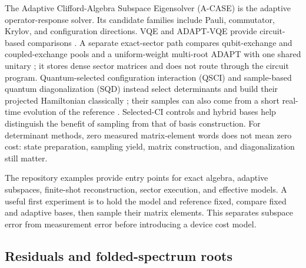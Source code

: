 \documentclass[aps,pra,reprint,superscriptaddress,nofootinbib,floatfix,
  showkeys]{revtex4-2}
\begin{document}
The Adaptive Clifford-Algebra Subspace Eigensolver (A-CASE) is the adaptive
operator-response solver. Its candidate families include
Pauli, commutator, Krylov, and configuration directions. VQE and ADAPT-VQE
provide circuit-based comparisons \cite{peruzzo2014vqe,grimsley2019adapt}.
A separate exact-sector path compares qubit-exchange and coupled-exchange pools
\cite{ramoa2025ceo} and a uniform-weight multi-root ADAPT with one shared
unitary \cite{grimsley2025excited}; it stores dense sector matrices and does not
route through the circuit program.
Quantum-selected configuration interaction (QSCI) and sample-based quantum
diagonalization (SQD) instead select determinants and build their projected
Hamiltonian classically \cite{kanno2026qsci,robledomoreno2025sqd}; their
samples can also come from a short real-time evolution of the reference
\cite{mikkelsen2025teqsci}. Selected-CI
controls \cite{huron1973cipsi} and hybrid bases help distinguish the benefit of
sampling from that of basis construction.
For determinant methods, zero measured matrix-element words does not mean zero
cost: state preparation, sampling yield, matrix construction, and diagonalization
still matter.

The repository examples provide entry points for exact algebra, adaptive
subspaces, finite-shot reconstruction, sector execution, and effective models.
A useful first experiment is to hold the model and reference fixed, compare
fixed and adaptive bases, then sample their matrix elements. This separates
subspace error from measurement error before introducing a device cost model.

\subsection{Residuals and folded-spectrum roots}
\label{sec:residuals}
\end{document}
